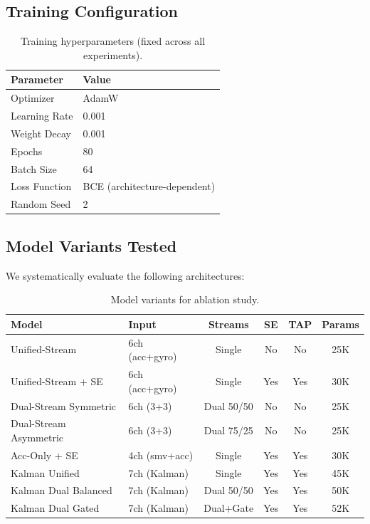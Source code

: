 \documentclass{article}
\begin{document}
\subsection{Training Configuration}

\begin{table}[htbp]
    \centering
    \caption{Training hyperparameters (fixed across all experiments).}
    \label{tab:training}
    \begin{tabular}{ll}
        \toprule
        \textbf{Parameter} & \textbf{Value} \\
        \midrule
        Optimizer & AdamW \\
        Learning Rate & 0.001 \\
        Weight Decay & 0.001 \\
        Epochs & 80 \\
        Batch Size & 64 \\
        Loss Function & BCE (architecture-dependent) \\
        Random Seed & 2 \\
        \bottomrule
    \end{tabular}
\end{table}

\subsection{Model Variants Tested}

We systematically evaluate the following architectures:

\begin{table}[htbp]
    \centering
    \caption{Model variants for ablation study.}
    \label{tab:model_variants}
    \begin{tabular}{llcccc}
        \toprule
        \textbf{Model} & \textbf{Input} & \textbf{Streams} & \textbf{SE} & \textbf{TAP} & \textbf{Params} \\
        \midrule
        Unified-Stream & 6ch (acc+gyro) & Single & No & No & 25K \\
        Unified-Stream + SE & 6ch (acc+gyro) & Single & Yes & Yes & 30K \\
        Dual-Stream Symmetric & 6ch (3+3) & Dual 50/50 & No & No & 25K \\
        Dual-Stream Asymmetric & 6ch (3+3) & Dual 75/25 & No & No & 25K \\
        Acc-Only + SE & 4ch (smv+acc) & Single & Yes & Yes & 30K \\
        Kalman Unified & 7ch (Kalman) & Single & Yes & Yes & 45K \\
        Kalman Dual Balanced & 7ch (Kalman) & Dual 50/50 & Yes & Yes & 50K \\
        Kalman Dual Gated & 7ch (Kalman) & Dual+Gate & Yes & Yes & 52K \\
        \bottomrule
    \end{tabular}
\end{table}
\end{document}
